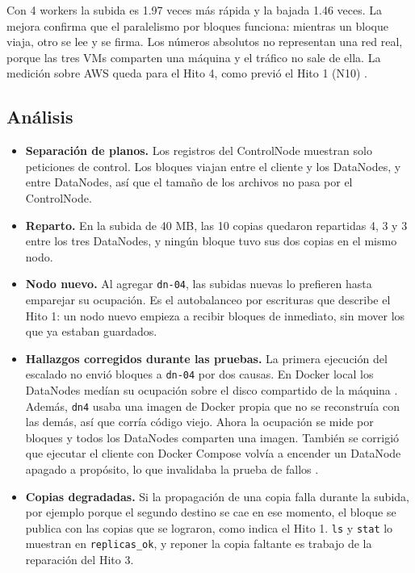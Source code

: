 \documentclass[10pt]{article}
\begin{document}
Con 4 workers la subida es 1.97 veces más rápida y la bajada 1.46 veces. La mejora confirma que el paralelismo por bloques funciona: mientras un bloque viaja, otro se lee y se firma. Los números absolutos no representan una red real, porque las tres VMs comparten una máquina y el tráfico no sale de ella. La medición sobre AWS queda para el Hito 4, como previó el Hito 1 (N10) .

\subsection{Análisis}

\begin{itemize}
\item \textbf{Separación de planos.} Los registros del ControlNode muestran solo peticiones de control. Los bloques viajan entre el cliente y los DataNodes, y entre DataNodes, así que el tamaño de los archivos no pasa por el ControlNode.
\item \textbf{Reparto.} En la subida de 40 MB, las 10 copias quedaron repartidas 4, 3 y 3 entre los tres DataNodes, y ningún bloque tuvo sus dos copias en el mismo nodo.
\item \textbf{Nodo nuevo.} Al agregar \texttt{dn-04}, las subidas nuevas lo prefieren hasta emparejar su ocupación. Es el autobalanceo por escrituras que describe el Hito 1: un nodo nuevo empieza a recibir bloques de inmediato, sin mover los que ya estaban guardados.
\item \textbf{Hallazgos corregidos durante las pruebas.} La primera ejecución del escalado no envió bloques a \texttt{dn-04} por dos causas. En Docker local los DataNodes medían su ocupación sobre el disco compartido de la máquina . Además, \texttt{dn4} usaba una imagen de Docker propia que no se reconstruía con las demás, así que corría código viejo. Ahora la ocupación se mide por bloques y todos los DataNodes comparten una imagen. También se corrigió que ejecutar el cliente con Docker Compose volvía a encender un DataNode apagado a propósito, lo que invalidaba la prueba de fallos .
\item \textbf{Copias degradadas.} Si la propagación de una copia falla durante la subida, por ejemplo porque el segundo destino se cae en ese momento, el bloque se publica con las copias que se lograron, como indica el Hito 1. \texttt{ls} y \texttt{stat} lo muestran en \texttt{replicas\_ok}, y reponer la copia faltante es trabajo de la reparación del Hito 3.
\end{itemize}
\end{document}
